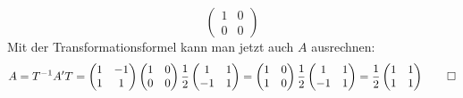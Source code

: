 \begin{loesung}
\begin{teilaufgaben}
\[\begin{pmatrix}
1&0\\
0&0
\end{pmatrix}
\]
Mit der Transformationsformel kann man jetzt auch $A$ ausrechnen:
\[
A=T^{-1}A'T
=
\begin{pmatrix}
1&-1\\
1&1
\end{pmatrix}
\begin{pmatrix}
1&0\\
0&0
\end{pmatrix}
\frac12\begin{pmatrix}
1&1\\
-1&1
\end{pmatrix}
=
\begin{pmatrix}1&0\\1&0\end{pmatrix}
\frac12\begin{pmatrix}
1&1\\
-1&1
\end{pmatrix}
=
\frac12
\begin{pmatrix}
1&1\\
1&1
\end{pmatrix}
\qedhere
\]
\end{teilaufgaben}
\end{loesung}

